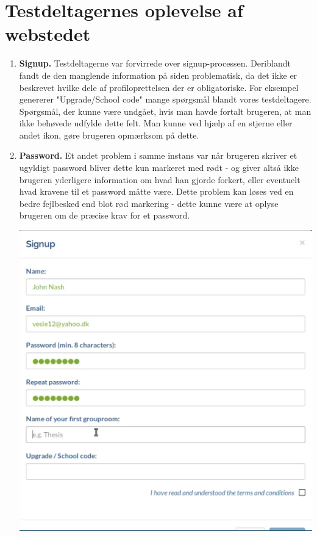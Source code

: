 \documentclass[12pt]{article}
\begin{document}
\section{Testdeltagernes oplevelse af webstedet}
\begin{enumerate}
  \item \textbf{Signup.} Testdeltagerne var forvirrede over signup-processen. Deriblandt fandt de den manglende information på siden problematisk, da det ikke er beskrevet hvilke dele af profiloprettelsen der er obligatoriske. For eksempel genererer "Upgrade/School code" mange spørgsmål blandt vores testdeltagere. Spørgsmål, der kunne være undgået, hvis man havde fortalt brugeren, at man ikke behøvede udfylde dette felt. Man kunne ved hjælp af en stjerne eller andet ikon, gøre brugeren opmærksom på dette.
    
  \item \textbf{Password.} Et andet problem i samme instans var når brugeren skriver et ugyldigt password bliver dette kun markeret med rødt - og giver altså ikke brugeren yderligere information om hvad han gjorde forkert, eller eventuelt hvad kravene til et password måtte være. Dette problem kan løses ved en bedre fejlbesked end blot rød markering - dette kunne være at oplyse brugeren om de præcise krav for et password.

    \begin{center}\includegraphics[scale=0.35]{Billeder/Signing-Up}\end{center}


\end{enumerate}
\end{document}
